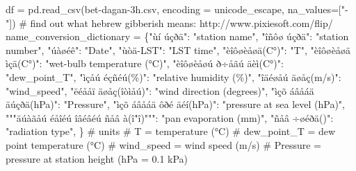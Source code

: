 \documentclass[
  letterpaper,
  DIV=11,
  numbers=noendperiod]{scrreprt}
\newenvironment{Shaded}{\begin{snugshade}}{\end{snugshade}}
\newcommand{\CommentTok}[1]{\textcolor[rgb]{0.37,0.37,0.37}{#1}}
\newcommand{\NormalTok}[1]{\textcolor[rgb]{0.00,0.23,0.31}{#1}}
\newcommand{\OperatorTok}[1]{\textcolor[rgb]{0.37,0.37,0.37}{#1}}
\newcommand{\StringTok}[1]{\textcolor[rgb]{0.13,0.47,0.30}{#1}}
\begin{document}
\begin{Shaded}
\begin{Highlighting}[]
\NormalTok{df }\OperatorTok{=}\NormalTok{ pd.read\_csv(}\StringTok{\textquotesingle{}bet{-}dagan{-}3h.csv\textquotesingle{}}\NormalTok{, encoding }\OperatorTok{=} \StringTok{\textquotesingle{}unicode\_escape\textquotesingle{}}\NormalTok{, na\_values}\OperatorTok{=}\NormalTok{[}\StringTok{"{-}"}\NormalTok{])}
\CommentTok{\# find out what hebrew gibberish means: http://www.pixiesoft.com/flip/}
\NormalTok{name\_conversion\_dictionary }\OperatorTok{=}\NormalTok{ \{}\StringTok{"ùí úçðä"}\NormalTok{: }\StringTok{"station name"}\NormalTok{,}
                              \StringTok{"îñôø úçðä"}\NormalTok{: }\StringTok{"station number"}\NormalTok{,}
                              \StringTok{"úàøéê"}\NormalTok{: }\StringTok{"Date"}\NormalTok{,}
                              \StringTok{"ùòä{-}LST"}\NormalTok{: }\StringTok{"LST time"}\NormalTok{,}
                              \StringTok{"èîôøèåøä(C°)"}\NormalTok{: }\StringTok{"T"}\NormalTok{,}
                              \StringTok{"èîôøèåøä ìçä(C°)"}\NormalTok{: }\StringTok{"wet{-}bulb temperature (°C)"}\NormalTok{,}
                              \StringTok{"èîôøèåøú ð÷åãú äèì(C°)"}\NormalTok{: }\StringTok{"dew\_point\_T"}\NormalTok{,}
                              \StringTok{"ìçåú éçñéú(\%)"}\NormalTok{: }\StringTok{"relative humidity (\%)"}\NormalTok{,}
                              \StringTok{"îäéøåú äøåç(m/s)"}\NormalTok{: }\StringTok{"wind\_speed"}\NormalTok{,}
                              \StringTok{"ëéååï äøåç(îòìåú)"}\NormalTok{: }\StringTok{"wind direction (degrees)"}\NormalTok{,}
                              \StringTok{"ìçõ áâåáä äúçðä(hPa)"}\NormalTok{: }\StringTok{"Pressure"}\NormalTok{,}
                              \StringTok{"ìçõ áâåáä ôðé äéí(hPa)"}\NormalTok{: }\StringTok{"pressure at sea level (hPa)"}\NormalTok{,}
                              \StringTok{"""äúàãåú éåîéú îâéâéú ñåâ à\textquotesingle{}(î"î)"""}\NormalTok{: }\StringTok{"pan evaporation (mm)"}\NormalTok{,}
                              \StringTok{"ñåâ ÷øéðä()"}\NormalTok{: }\StringTok{"radiation type"}\NormalTok{,}
\NormalTok{                             \}}
\CommentTok{\# units}
\CommentTok{\# T = temperature (°C)}
\CommentTok{\# dew\_point\_T = dew point temperature (°C)}
\CommentTok{\# wind\_speed = wind speed (m/s)}
\CommentTok{\# Pressure = pressure at station height (hPa = 0.1 kPa)}


\end{Highlighting}
\end{Shaded}
\end{document}
